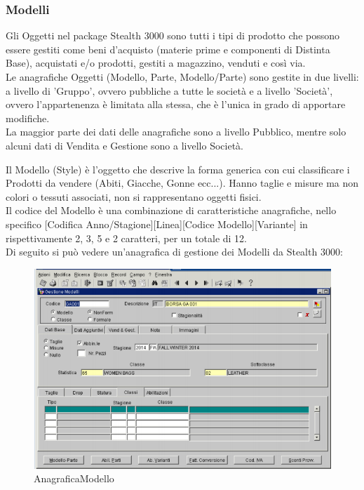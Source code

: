 \subsubsection{Modelli}
Gli Oggetti nel package Stealth 3000 sono tutti i tipi di prodotto che possono essere gestiti come beni d’acquisto (materie prime e componenti di Distinta Base), acquistati e/o prodotti, gestiti a magazzino, venduti e così via. \\
Le anagrafiche Oggetti (Modello, Parte, Modello/Parte) sono gestite in due livelli: a livello di 'Gruppo', ovvero pubbliche a tutte le società e a livello 'Società', ovvero l'appartenenza è limitata alla stessa, che è l'unica in grado di apportare modifiche.\\
 La maggior parte dei dati delle anagrafiche sono a livello Pubblico, mentre solo alcuni dati di Vendita e Gestione sono a livello Società.

Il Modello (Style) è l’oggetto che descrive la forma generica con cui classificare i Prodotti da vendere (Abiti, Giacche, Gonne ecc...). Hanno taglie e misure ma non colori o tessuti associati, non si rappresentano oggetti fisici.\\ 
Il codice del Modello è una combinazione di caratteristiche anagrafiche, nello specifico [Codifica Anno/Stagione][Linea][Codice Modello][Variante] in rispettivamente 2, 3, 5 e 2 caratteri, per un totale di 12.\\
Di seguito si può vedere un'anagrafica di gestione dei Modelli da Stealth 3000:
\begin{figure}[!h]
\thispagestyle{empty}
\centering
\includegraphics[scale=0.90]{img/Modello.png}
\caption{AnagraficaModello}
\end{figure}
\newpage


